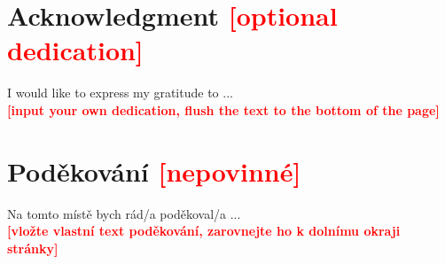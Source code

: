\newpage

\vfill

\vglue 15cm

\section*{Acknowledgment \textbf{\textcolor{red}{[optional
dedication]}}}
\noindent I would like to express my gratitude to ... \\
\textbf{\textcolor{red}{[input your own dedication, flush the text
to the bottom of the page]}}

\newpage

\vfill

\vglue 15cm

\section*{Poděkování \textbf{\textcolor{red}{[nepovinné]}}}
\noindent Na tomto místě bych rád/a poděkoval/a ... \\
\textbf{\textcolor{red}{[vložte vlastní text poděkování, zarovnejte
ho k dolnímu okraji stránky]}}
